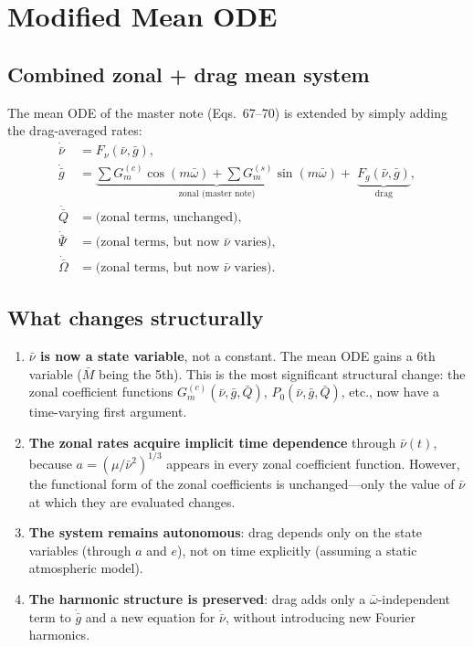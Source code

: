 \documentclass[11pt]{article}
\begin{document}
\section{Modified Mean ODE}

\subsection{Combined zonal + drag mean system}

The mean ODE of the master note (Eqs.~67--70) is extended by simply adding
the drag-averaged rates:
\begin{align}
\dot{\bar\nu}
&= F_\nu(\bar\nu, \bar g),
\label{eq:nudot_combined}\\
\dot{\bar g}
&=
\underbrace{
\sum G^{(c)}_m \cos(m\bar\omega) + \sum G^{(s)}_m \sin(m\bar\omega)
}_{\text{zonal (master note)}}
+\;
\underbrace{F_g(\bar\nu, \bar g)}_{\text{drag}},
\label{eq:gdot_combined}\\
\dot{\bar Q}
&= \text{(zonal terms, unchanged)},
\label{eq:Qdot_combined}\\
\dot{\bar\Psi}
&= \text{(zonal terms, but now $\bar\nu$ varies)},
\label{eq:Psidot_combined}\\
\dot{\bar\Omega}
&= \text{(zonal terms, but now $\bar\nu$ varies)}.
\label{eq:Omegadot_combined}
\end{align}

\subsection{What changes structurally}

\begin{enumerate}
\item \textbf{$\bar\nu$ is now a state variable}, not a constant. The mean
ODE gains a 6th variable ($\bar M$ being the 5th). This is the most
significant structural change: the zonal coefficient functions
$G^{(c)}_m(\bar\nu, \bar g, \bar Q)$, $P_0(\bar\nu, \bar g, \bar Q)$, etc.,
now have a time-varying first argument.

\item \textbf{The zonal rates acquire implicit time dependence} through
$\bar\nu(t)$, because $a = (\mu/\bar\nu^2)^{1/3}$ appears in every zonal
coefficient function. However, the functional form of the zonal coefficients
is unchanged---only the value of $\bar\nu$ at which they are evaluated
changes.

\item \textbf{The system remains autonomous}: drag depends only on the
state variables (through $a$ and $e$), not on time explicitly (assuming a
static atmospheric model).

\item \textbf{The harmonic structure is preserved}: drag adds only a
$\bar\omega$-independent term to $\dot{\bar g}$ and a new equation for
$\dot{\bar\nu}$, without introducing new Fourier harmonics.
\end{enumerate}
\end{document}
